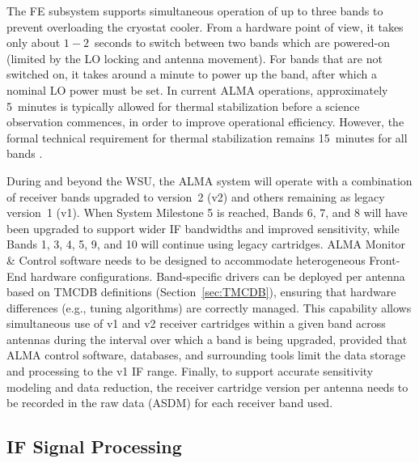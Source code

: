 The \ac{FE} subsystem supports simultaneous operation of up to three bands to prevent overloading the cryostat cooler.
From a hardware point of view, it takes only about $1-2$~seconds to switch between two bands which are powered-on (limited by the \ac{LO} locking and antenna movement).
For bands that are not switched on, it takes around a minute to power up the band, after which a nominal \ac{LO} power must be set. In current \ac{ALMA} operations, approximately 5~minutes is typically allowed for thermal stabilization before a science observation commences, in order to improve operational efficiency. However, the formal technical requirement for thermal stabilization remains 15~minutes for all bands \cite{sys_reqs}.

During and beyond the \ac{WSU}, the \ac{ALMA} system will operate with a combination of receiver bands upgraded to version~2 (v2) and others remaining as legacy version~1 (v1).
When System Milestone 5 is reached, Bands 6, 7, and 8 will have been upgraded to support wider IF bandwidths and improved sensitivity, while Bands 1, 3, 4, 5, 9, and 10 will continue using legacy cartridges.
ALMA Monitor \& Control software needs to be designed to accommodate heterogeneous Front-End hardware configurations.
Band-specific drivers can be deployed per antenna based on TMCDB definitions (Section~\ref{sec:TMCDB}), ensuring that hardware differences (e.g., tuning algorithms) are correctly managed.
This capability allows simultaneous use of v1 and v2 receiver cartridges within a given band across antennas during the interval over which a band is being upgraded, provided that ALMA control software, databases, and surrounding tools limit the data storage and processing to the v1 \ac{IF} range. 
Finally, to support accurate sensitivity modeling and data reduction, the receiver cartridge version per antenna needs to be recorded in the raw data (\ac{ASDM}) for each receiver band used.


\subsection{IF Signal Processing}
\label{sec:WIFP}



